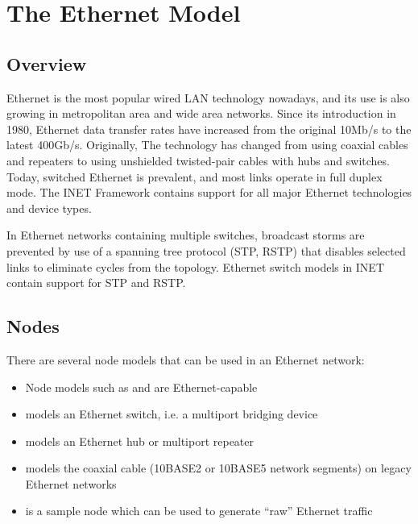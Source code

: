 \chapter{The Ethernet Model}
\label{cha:ethernet}


\section{Overview}
\label{sec:ethernet:overview}

Ethernet is the most popular wired LAN technology nowadays, and its use is also
growing in metropolitan area and wide area networks. Since its introduction in
1980, Ethernet data transfer rates have increased from the original 10Mb/s to
the latest 400Gb/s. Originally, The technology has changed from using coaxial
cables and repeaters to using unshielded twisted-pair cables with hubs and
switches. Today, switched Ethernet is prevalent, and most links operate in full
duplex mode. The INET Framework contains support for all major Ethernet
technologies and device types.


In Ethernet networks containing multiple switches, broadcast storms are
prevented by use of a spanning tree protocol (STP, RSTP) that disables selected
links to eliminate cycles from the topology. Ethernet switch models in INET
contain support for STP and RSTP.

\section{Nodes}
\label{sec:ethernet:nodes}

There are several node models that can be used in an Ethernet network:

\begin{itemize}
  \item Node models such as  and  are Ethernet-capable
  \item {} models an Ethernet switch, i.e. a multiport bridging device
  \item {} models an Ethernet hub or multiport repeater
  \item {} models the coaxial cable (10BASE2 or 10BASE5 network segments) on legacy Ethernet networks
  \item {} is a sample node which can be used to generate ``raw'' Ethernet traffic
\end{itemize}


